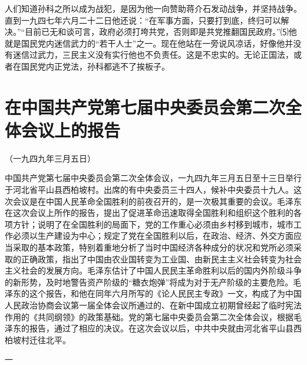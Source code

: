 \documentclass[UTF-8, a5paper, 12pt]{ctexart}
\begin{document}
人们知道孙科之所以成为战犯，是因为他一向赞助蒋介石发动战争，并坚持战争。直到一九四七年六月二十二日他还说：“在军事方面，只要打到底，终归可以解决。”“目前已无和谈可言，政府必须打垮共党，否则即是共党推翻国民政府。”⑸他就是国民党内迷信武力的“若干人士”之一。现在他站在一旁说风凉话，好像他并没有迷信过武力，三民主义没有实行他也不负责任。这是不忠实的。无论正国法，或者在国民党内正党法，孙科都逃不了挨板子。

\section{在中国共产党第七届中央委员会第二次全体会议上的报告}

（一九四九年三月五日）

中国共产党第七届中央委员会第二次全体会议，一九四九年三月五日至十三日举行于河北省平山县西柏坡村。出席的有中央委员三十四人，候补中央委员十九人。这次会议是在中国人民革命全国胜利的前夜召开的，是一次极其重要的会议。毛泽东在这次会议上所作的报告，提出了促进革命迅速取得全国胜利和组织这个胜利的各项方针；说明了在全国胜利的局面下，党的工作重心必须由乡村移到城市，城市工作必须以生产建设为中心；规定了党在全国胜利以后，在政治、经济、外交方面应当采取的基本政策，特别着重地分析了当时中国经济各种成分的状况和党所必须采取的正确政策，指出了中国由农业国转变为工业国、由新民主主义社会转变为社会主义社会的发展方向。毛泽东估计了中国人民民主革命胜利以后的国内外阶级斗争的新形势，及时地警告资产阶级的“糖衣炮弹”将成为对于无产阶级的主要危险。毛泽东的这个报告，和他在同年六月所写的《论人民民主专政》一文，构成了为中国人民政治协商会议第一届全体会议所通过的、在新中国成立初期曾经起了临时宪法作用的《共同纲领》的政策基础。党的第七届中央委员会第二次全体会议，根据毛泽东的报告，通过了相应的决议。在这次会议以后，中共中央就由河北省平山县西柏坡村迁往北平。

一
\end{document}
